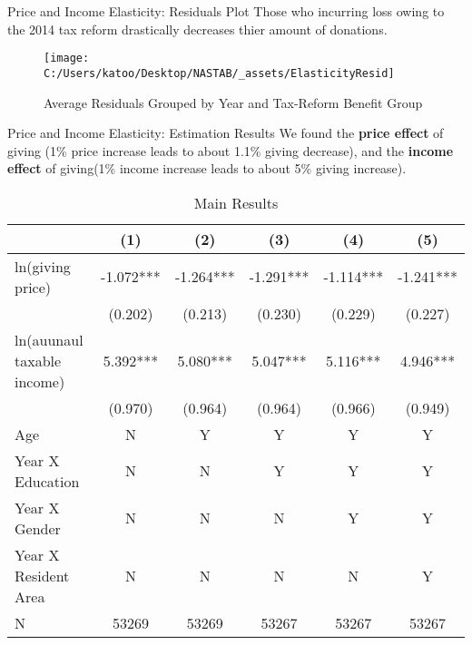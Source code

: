 \documentclass[
  ignorenonframetext,
]{beamer}
\begin{document}
\begin{frame}{Price and Income Elasticity: Residuals Plot}
\protect\hypertarget{price-and-income-elasticity-residuals-plot}{}
Those who incurring loss owing to the 2014 tax reform drastically decreases thier amount of donations.

\begin{figure}

{\centering \texttt{[image: C:/Users/katoo/Desktop/NASTAB/\_assets/ElasticityResid]} 

}

\caption{Average Residuals Grouped by Year and Tax-Reform Benefit Group}\label{fig:showElasticityResid}
\end{figure}
\end{frame}

\begin{frame}{Price and Income Elasticity: Estimation Results}
\protect\hypertarget{price-and-income-elasticity-estimation-results}{}
We found the \textbf{price effect} of giving (1\% price increase leads to about 1.1\% giving decrease),
and the \textbf{income effect} of giving(1\% income increase leads to about 5\% giving increase).

\begin{table}

\caption{\label{tab:kableEstimateElasticityPart1}Main Results}
\centering
\fontsize{7}{9}\selectfont
\begin{tabular}[t]{lccccc}
\toprule
 & (1) & (2) & (3) & (4) & (5)\\
\midrule
ln(giving price) & -1.072*** & -1.264*** & -1.291*** & -1.114*** & -1.241***\\
 & (0.202) & (0.213) & (0.230) & (0.229) & (0.227)\\
ln(auunaul taxable income) & 5.392*** & 5.080*** & 5.047*** & 5.116*** & 4.946***\\
 & (0.970) & (0.964) & (0.964) & (0.966) & (0.949)\\
Age & N & Y & Y & Y & Y\\
Year X Education & N & N & Y & Y & Y\\
Year X Gender & N & N & N & Y & Y\\
Year X Resident Area & N & N & N & N & Y\\
N & 53269 & 53269 & 53267 & 53267 & 53267\\
\bottomrule
\end{tabular}
\end{table}
\end{frame}
\end{document}
